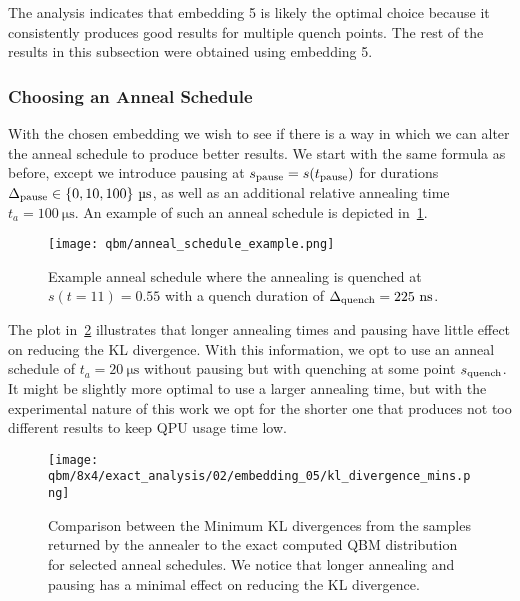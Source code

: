 The analysis indicates that embedding 5 is likely the optimal choice because it consistently produces good results for multiple quench points.
The rest of the results in this subsection were obtained using embedding 5.

\subsubsection{Choosing an Anneal Schedule}
With the chosen embedding we wish to see if there is a way in which we can alter the anneal schedule to produce better results.
We start with the same formula as before, except we introduce pausing at \( s_{\text{pause}} = s(t_{\text{pause}}) \) for durations \( \Deltapause \in \{ 0, 10, 100 \} \ \si{\micro\second} \), as well as an additional relative annealing time \( t_a = 100 \ \si{\micro\second} \).
An example of such an anneal schedule is depicted in~\cref{fig:anneal_schedule_example}.
\begin{figure}[!htb]
    \begin{center}
        \texttt{[image: qbm/anneal\_schedule\_example.png]}
    \end{center}
    \caption{Example anneal schedule where the annealing is quenched at \( s(t = 11) = 0.55 \) with a quench duration of \( \Delta_{\text{quench}} = 225 \ \si{\nano\second} \).}
    \label{fig:anneal_schedule_example}
\end{figure}

The plot in~\cref{fig:dkl_mins_embedding_05} illustrates that longer annealing times and pausing have little effect on reducing the KL divergence.
With this information, we opt to use an anneal schedule of \( t_a = 20 \ \si{\micro\second} \) without pausing but with quenching at some point \( s_{\text{quench}} \).
It might be slightly more optimal to use a larger annealing time, but with the experimental nature of this work we opt for the shorter one that produces not too different results to keep QPU usage time low.

\begin{figure}[!htb]
    \begin{center}
        \texttt{[image: qbm/8x4/exact\_analysis/02/embedding\_05/kl\_divergence\_mins.png]}
    \end{center}
    \caption{Comparison between the Minimum KL divergences from the samples returned by the annealer to the exact computed QBM distribution for selected anneal schedules. We notice that longer annealing and pausing has a minimal effect on reducing the KL divergence.}
    \label{fig:dkl_mins_embedding_05}
\end{figure}

